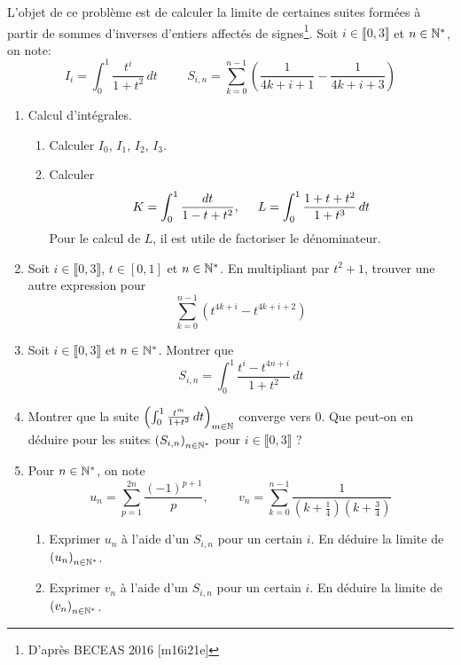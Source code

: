 L'objet de ce problème est de calculer la limite de certaines suites formées à partir de sommes d'inverses d'entiers affectés de signes\footnote{D'après BECEAS 2016 [m16i21e]}.\newline
Soit $i\in \llbracket 0, 3 \rrbracket$ et $n\in \mathbb{N}^*$, on note:
\begin{displaymath}
  I_i = \int_0^1 \frac{t^i}{1+t^2}\,dt \hspace{1cm}
  S_{i,n} = \sum_{k=0}^{n-1}\left( \frac{1}{4k+i+1} - \frac{1}{4k+i+3}\right)
\end{displaymath}

\begin{enumerate}
  \item Calcul d'intégrales.
\begin{enumerate}
  \item Calculer $I_0$, $I_1$, $I_2$, $I_3$.
  \item Calculer
\begin{displaymath}
K = \int_0^1 \frac{dt}{1-t+t^2}, \hspace{0.5cm}
L = \int_0^1 \frac{1+t+t^2}{1+t^3}\, dt
\end{displaymath}
Pour le calcul de $L$, il est utile de factoriser le dénominateur.
\end{enumerate}

  \item Soit $i\in \llbracket 0, 3 \rrbracket$, $t\in [0,1]$ et $n\in \mathbb{N}^*$. En multipliant par $t^2+1$, trouver une autre expression pour
\begin{displaymath}
  \sum_{k=0}^{n-1}\left( t^{4k+i} - t^{4k+i+2}\right) 
\end{displaymath}

  \item Soit $i\in \llbracket 0, 3 \rrbracket$ et $n\in \mathbb{N}^*$. Montrer que
\begin{displaymath}
  S_{i,n} = \int_{0}^{1}\frac{t^i - t^{4n+i}}{1+t^2}\,dt
\end{displaymath}

  \item Montrer que la suite $\left(\int_{0}^{1}\frac{t^{m}}{1+t^2}\,dt \right)_{m\in \mathbb{N}}$ converge vers $0$. Que peut-on en déduire pour les suites $\left( S_{i,n}\right)_{n\in \mathbb{N}^*}$ pour $i\in \llbracket 0,3 \rrbracket$ ?
  
  \item Pour $n\in \mathbb{N}^*$, on note 
\begin{displaymath}
  u_n = \sum_{p=1}^{2n}\frac{(-1)^{p+1}}{p}, \hspace{1cm} v_n = \sum_{k=0}^{n-1}\frac{1}{(k+\frac{1}{4})(k+\frac{3}{4})}
\end{displaymath}
  \begin{enumerate}
    \item Exprimer $u_n$ à l'aide d'un $S_{i,n}$ pour un certain $i$. En déduire la limite de $\left( u_n\right)_{n\in \mathbb{N}^*}$.
    \item Exprimer $v_n$ à l'aide d'un $S_{i,n}$ pour un certain $i$. En déduire la limite de $\left( v_n\right)_{n\in \mathbb{N}^*}$.
  \end{enumerate}


\end{enumerate}
